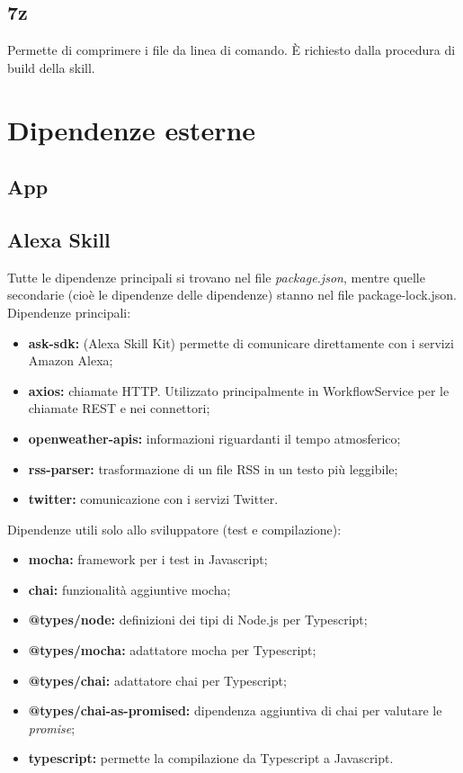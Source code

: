 \subsection{7z}
Permette di comprimere i file da linea di comando. \`{E} richiesto dalla procedura di build della skill.



\section{Dipendenze esterne}
\subsection{App}


\subsection{Alexa Skill}\label{ATecnologie}
Tutte le dipendenze principali si trovano nel file \textit{package.json}, mentre quelle secondarie (cioè le dipendenze delle dipendenze) stanno nel file package-lock.json.\\
Dipendenze principali:
\begin{itemize}
    \item \textbf{ask-sdk:} (Alexa Skill Kit) permette di comunicare direttamente con i servizi Amazon Alexa;
    \item \textbf{axios:} chiamate HTTP. Utilizzato principalmente in WorkflowService per le chiamate REST e nei connettori;
    \item \textbf{openweather-apis:} informazioni riguardanti il tempo atmosferico;
    \item \textbf{rss-parser:} trasformazione di un file RSS in un testo più leggibile;
    \item \textbf{twitter:} comunicazione con i servizi Twitter.
\end{itemize}
Dipendenze utili solo allo sviluppatore (test e compilazione):
\begin{itemize}
    \item \textbf{mocha:} framework per i test in Javascript;
    \item \textbf{chai:} funzionalità aggiuntive mocha;
    \item \textbf{@types/node:} definizioni dei tipi di Node.js per Typescript;
    \item \textbf{@types/mocha:} adattatore mocha per Typescript; 
    \item \textbf{@types/chai:} adattatore chai per Typescript;
    \item \textbf{@types/chai-as-promised:} dipendenza aggiuntiva di chai per valutare le \textit{promise};
    \item \textbf{typescript:} permette la compilazione da Typescript a Javascript.
\end{itemize}

